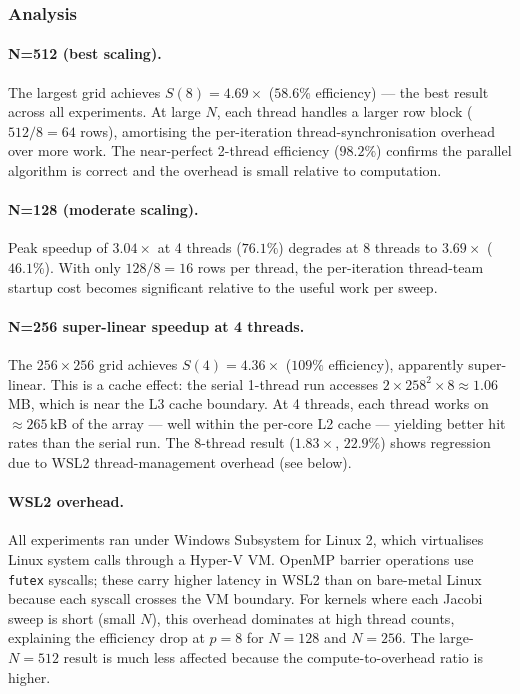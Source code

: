 \documentclass[12pt,a4paper]{article}
\begin{document}
\subsubsection*{Analysis}

\paragraph{N=512 (best scaling).}
The largest grid achieves $S(8)=4.69\times$ ($58.6\%$ efficiency) —
the best result across all experiments. At large $N$, each thread handles
a larger row block ($512/8=64$ rows), amortising the per-iteration
thread-synchronisation overhead over more work. The near-perfect 2-thread
efficiency ($98.2\%$) confirms the parallel algorithm is correct and the
overhead is small relative to computation.

\paragraph{N=128 (moderate scaling).}
Peak speedup of $3.04\times$ at 4 threads ($76.1\%$) degrades at 8
threads to $3.69\times$ ($46.1\%$). With only $128/8=16$ rows per thread,
the per-iteration thread-team startup cost becomes significant relative to
the useful work per sweep.

\paragraph{N=256 super-linear speedup at 4 threads.}
The $256\times256$ grid achieves $S(4)=4.36\times$ ($109\%$ efficiency),
apparently super-linear. This is a cache effect: the serial 1-thread run
accesses $2\times258^2\times8\approx1.06$\,MB, which is near the L3 cache
boundary. At 4 threads, each thread works on $\approx 265$\,kB of the
array — well within the per-core L2 cache — yielding better hit rates than
the serial run. The 8-thread result ($1.83\times$, $22.9\%$) shows
regression due to WSL2 thread-management overhead (see below).

\paragraph{WSL2 overhead.}
All experiments ran under Windows Subsystem for Linux 2, which virtualises
Linux system calls through a Hyper-V VM. OpenMP barrier operations use
\texttt{futex} syscalls; these carry higher latency in WSL2 than on
bare-metal Linux because each syscall crosses the VM boundary. For kernels
where each Jacobi sweep is short (small $N$), this overhead dominates at
high thread counts, explaining the efficiency drop at $p=8$ for $N=128$
and $N=256$. The large-$N=512$ result is much less affected because the
compute-to-overhead ratio is higher.
\end{document}
